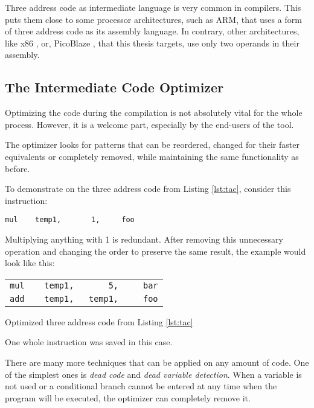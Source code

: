             Three address code as intermediate language is very common in compilers. This puts them close to some processor architectures, such as ARM, that uses a form of three address code as its assembly language. \cite{ARM} In contrary, other architectures, like x86 \cite{x86}, or, PicoBlaze \cite{PicoBlaze6}, that this thesis targets, use only two operands in their assembly.

        \subsection{The Intermediate Code Optimizer}

            Optimizing the code during the compilation is not absolutely vital for the whole process. However, it is a welcome part, especially by the end-users of the tool.

            The optimizer looks for patterns that can be reordered, changed for their faster equivalents or completely removed, while maintaining the same functionality as before.

            To demonstrate on the three address code from Listing \ref{lst:tac}, consider this instruction:

            \begin{center}\verb|mul    temp1,       1,     foo|\end{center}

            Multiplying anything with 1 is redundant. After removing this unnecessary operation and changing the order to preserve the same result, the example would look like this:

            \begin{listing}\centering\begin{tabular}{l}
            \verb|mul    temp1,       5,     bar|\\
            \verb|add    temp1,   temp1,     foo|\\
            \end{tabular}
            \caption{Optimized three address code from Listing \ref{lst:tac}}\label{lst:opttac}
            \end{listing}

            One whole instruction was saved in this case.

            There are many more techniques that can be applied on any amount of code. One of the simplest ones is \emph{dead code} and \emph{dead variable detection}. When a variable is not used or a conditional branch cannot be entered at any time when the program will be executed, the optimizer can completely remove it.\cite{OptimizingCompiler}

